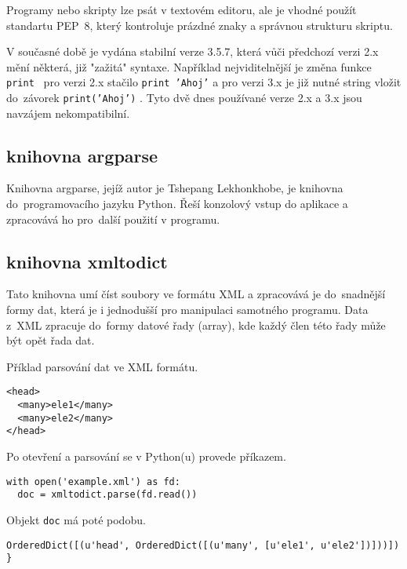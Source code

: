 Programy nebo skripty lze psát v textovém editoru, ale je vhodné
použít standartu PEP~8, který kontroluje prázdné znaky a správnou
strukturu skriptu. 

V současné době je vydána stabilní verze 3.5.7, která vůči předchozí
verzi 2.x mění některá, již "zažitá" syntaxe. Například 
nejviditelnější je změna funkce {\tt print } pro verzi 2.x stačilo
 {\tt print 'Ahoj'}  a pro verzi 3.x je již nutné string vložit
do~závorek  {\tt print('Ahoj')}  . Tyto dvě dnes používané verze 2.x
a 3.x jsou navzájem nekompatibilní.
\cite{python} 
\cite{wikiPython} 
  
\subsection{knihovna argparse}
\label{argparse} 
Knihovna argparse, jejíž autor je Tshepang Lekhonkhobe, je knihovna 
do~programovacího jazyku Python. Řeší konzolový vstup do aplikace a 
zpracovává ho pro~další použití v programu.\cite{argparse}

\subsection{knihovna xmltodict}
\label{xmltodict} 
Tato knihovna umí číst soubory ve formátu XML a zpracovává je
do~snadnější formy dat, která je i jednodušší pro manipulaci samotného
programu. Data z~XML zpracuje do~formy datové řady (array), kde každý
člen této řady může být opět řada dat.\cite{xmltodict}

Příklad parsování dat ve XML formátu.

{\scriptsize
\begin{lstlisting}
<head>
  <many>ele1</many>
  <many>ele2</many>
</head>
\end{lstlisting}
}

Po otevření a parsování se v Python(u) provede příkazem.

{\scriptsize
\lstset{language=Python}
\begin{lstlisting}
with open('example.xml') as fd: 
  doc = xmltodict.parse(fd.read()) 
\end{lstlisting}
}

Objekt {\tt doc} má poté podobu.

{\scriptsize
\lstset{language=Python}
\begin{lstlisting}
OrderedDict([(u'head', OrderedDict([(u'many', [u'ele1', u'ele2'])]))]) }
\end{lstlisting}
}

